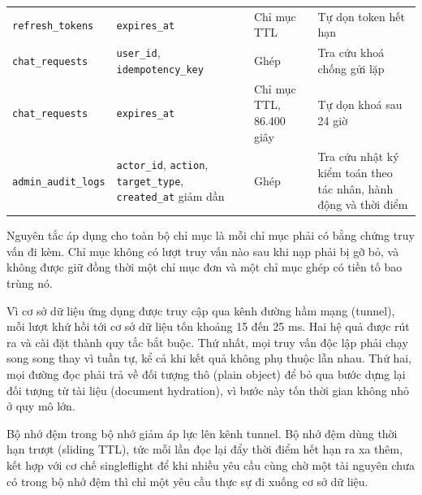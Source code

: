 \begin{table}[htbp]
\begin{tabularx}{\textwidth}{@{}>{\raggedright\arraybackslash}p{3.2cm}>{\raggedright\arraybackslash}p{4.1cm}>{\raggedright\arraybackslash}p{2.8cm}>{\raggedright\arraybackslash}X@{}}
        \texttt{refresh\_tokens} & \texttt{expires\_at} & Chỉ mục TTL & Tự dọn token hết hạn \\
        \texttt{chat\_requests} & \texttt{user\_id}, \texttt{idempotency\_key} & Ghép & Tra cứu khoá chống gửi lặp \\
        \texttt{chat\_requests} & \texttt{expires\_at} & Chỉ mục TTL, 86.400 giây & Tự dọn khoá sau 24 giờ \\
        \texttt{admin\_audit\_logs} & \texttt{actor\_id}, \texttt{action}, \texttt{target\_type}, \texttt{created\_at} giảm dần & Ghép & Tra cứu nhật ký kiểm toán theo tác nhân, hành động và thời điểm \\
        \bottomrule
    \end{tabularx}
\end{table}

Nguyên tắc áp dụng cho toàn bộ chỉ mục là mỗi chỉ mục phải có bằng chứng truy vấn đi kèm. Chỉ mục không có lượt truy vấn nào sau khi nạp phải bị gỡ bỏ, và không được giữ đồng thời một chỉ mục đơn và một chỉ mục ghép có tiền tố bao trùng nó.

Vì cơ sở dữ liệu ứng dụng được truy cập qua kênh đường hầm mạng (tunnel), mỗi lượt khứ hồi tới cơ sở dữ liệu tốn khoảng 15 đến 25 ms. Hai hệ quả được rút ra và cài đặt thành quy tắc bắt buộc. Thứ nhất, mọi truy vấn độc lập phải chạy song song thay vì tuần tự, kể cả khi kết quả không phụ thuộc lẫn nhau. Thứ hai, mọi đường đọc phải trả về đối tượng thô (plain object) để bỏ qua bước dựng lại đối tượng từ tài liệu (document hydration), vì bước này tốn thời gian không nhỏ ở quy mô lớn.

Bộ nhớ đệm trong bộ nhớ giảm áp lực lên kênh tunnel. Bộ nhớ đệm dùng thời hạn trượt (sliding TTL), tức mỗi lần đọc lại đẩy thời điểm hết hạn ra xa thêm, kết hợp với cơ chế singleflight để khi nhiều yêu cầu cùng chờ một tài nguyên chưa có trong bộ nhớ đệm thì chỉ một yêu cầu thực sự đi xuống cơ sở dữ liệu.

